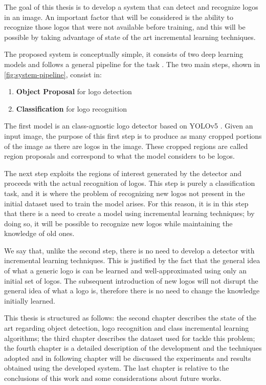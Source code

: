 The goal of this thesis is to develop a system that can detect and recognize logos in an image. An important factor that will be considered is the ability to recognize those logos that were not available before training, and this will be possible by taking advantage of state of the art incremental learning techniques.

The proposed system is conceptually simple, it consists of two deep learning models and follows a general pipeline for the task \cite{bianco2017deep}. The two main steps, shown in \autoref{fig:system-pipeline}, consist in:

\begin{enumerate}
    \item \textbf{Object Proposal} for logo detection
    \item \textbf{Classification} for logo recognition
\end{enumerate}

The first model is an class-agnostic logo detector based on YOLOv5 \cite{glenn_jocher_2021_5563715}. Given an input image, the purpose of this first step is to produce as many cropped portions of the image as there are logos in the image. These cropped regions are called region proposals and correspond to what the model considers to be logos.

The next step exploits the regions of interest generated by the detector and proceeds with the actual recognition of logos. This step is purely a classification task, and it is where the problem of recognizing new logos not present in the initial dataset used to train the model arises. For this reason, it is in this step that there is a need to create a model using incremental learning techniques; by doing so, it will be possible to recognize new logos while maintaining the knowledge of old ones.

We say that, unlike the second step, there is no need to develop a detector with incremental learning techniques. This is justified by the fact that the general idea of what a generic logo is can be learned and well-approximated using only an initial set of logos. The subsequent introduction of new logos will not disrupt the general idea of what a logo is, therefore there is no need to change the knowledge initially learned.

\vspace{1.5\baselineskip}
This thesis is structured as follows: the second chapter describes the state of the art regarding object detection, logo recognition and class incremental learning algorithms; the third chapter describes the dataset used for tackle this problem; the fourth chapter is a detailed description of the development and the techniques adopted and in following chapter will be discussed the experiments and results obtained using the developed system. The last chapter is relative to the conclusions of this work and some considerations about future works.
